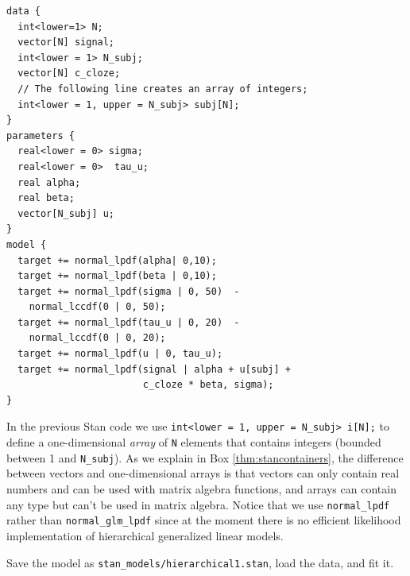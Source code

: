 \documentclass[12pt,]{krantz}
\theoremstyle{definition}
\theoremstyle{definition}
\theoremstyle{definition}
\theoremstyle{remark}
\begin{document}
\begin{verbatim}
data {
  int<lower=1> N;
  vector[N] signal;
  int<lower = 1> N_subj;
  vector[N] c_cloze;
  // The following line creates an array of integers;
  int<lower = 1, upper = N_subj> subj[N]; 
}
parameters {
  real<lower = 0> sigma;
  real<lower = 0>  tau_u;   
  real alpha;
  real beta;
  vector[N_subj] u;
}
model {
  target += normal_lpdf(alpha| 0,10);
  target += normal_lpdf(beta | 0,10);
  target += normal_lpdf(sigma | 0, 50)  -
    normal_lccdf(0 | 0, 50);
  target += normal_lpdf(tau_u | 0, 20)  -
    normal_lccdf(0 | 0, 20);
  target += normal_lpdf(u | 0, tau_u);
  target += normal_lpdf(signal | alpha + u[subj] +
                        c_cloze * beta, sigma);
}
\end{verbatim}

In the previous Stan code we use \texttt{int\textless{}lower\ =\ 1,\ upper\ =\ N\_subj\textgreater{}\ i{[}N{]};} to define a one-dimensional \emph{array} of \texttt{N} elements that contains integers (bounded between 1 and \texttt{N\_subj}). As we explain in Box \ref{thm:stancontainers}, the difference between vectors and one-dimensional arrays is that vectors can only contain real numbers and can be used with matrix algebra functions, and arrays can contain any type but can't be used in matrix algebra. Notice that we use \texttt{normal\_lpdf} rather than \texttt{normal\_glm\_lpdf} since at the moment there is no efficient likelihood implementation of hierarchical generalized linear models.

Save the model as \texttt{stan\_models/hierarchical1.stan}, load the data, and fit it.
\end{document}
